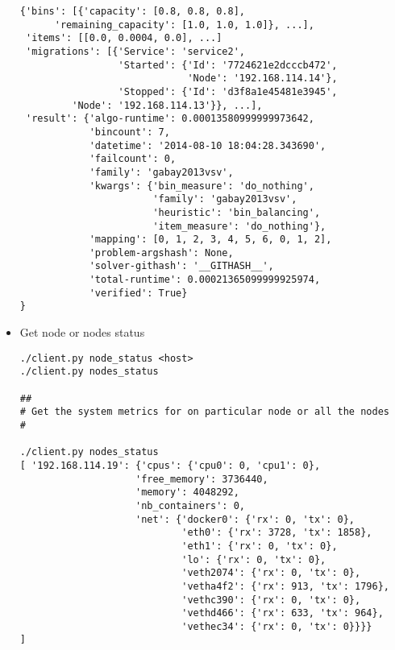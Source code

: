 \begin{itemize}
{\begin{lstlisting}
{'bins': [{'capacity': [0.8, 0.8, 0.8],
	  'remaining_capacity': [1.0, 1.0, 1.0]}, ...],
 'items': [[0.0, 0.0004, 0.0], ...]
 'migrations': [{'Service': 'service2',
                 'Started': {'Id': '7724621e2dcccb472',
                             'Node': '192.168.114.14'},
                 'Stopped': {'Id': 'd3f8a1e45481e3945',
		 'Node': '192.168.114.13'}}, ...],
 'result': {'algo-runtime': 0.00013580999999973642,
            'bincount': 7,
            'datetime': '2014-08-10 18:04:28.343690',
            'failcount': 0,
            'family': 'gabay2013vsv',
            'kwargs': {'bin_measure': 'do_nothing',
                       'family': 'gabay2013vsv',
                       'heuristic': 'bin_balancing',
                       'item_measure': 'do_nothing'},
            'mapping': [0, 1, 2, 3, 4, 5, 6, 0, 1, 2],
            'problem-argshash': None,
            'solver-githash': '__GITHASH__',
            'total-runtime': 0.00021365099999925974,
            'verified': True}
}

\end{lstlisting}
}
\item{Get node or nodes status
\begin{lstlisting}
./client.py node_status <host>
./client.py nodes_status

##
# Get the system metrics for on particular node or all the nodes
#

./client.py nodes_status
[ '192.168.114.19': {'cpus': {'cpu0': 0, 'cpu1': 0},
                    'free_memory': 3736440,
                    'memory': 4048292,
                    'nb_containers': 0,
                    'net': {'docker0': {'rx': 0, 'tx': 0},
                            'eth0': {'rx': 3728, 'tx': 1858},
                            'eth1': {'rx': 0, 'tx': 0},
                            'lo': {'rx': 0, 'tx': 0},
                            'veth2074': {'rx': 0, 'tx': 0},
                            'vetha4f2': {'rx': 913, 'tx': 1796},
                            'vethc390': {'rx': 0, 'tx': 0},
                            'vethd466': {'rx': 633, 'tx': 964},
                            'vethec34': {'rx': 0, 'tx': 0}}}}
]
\end{lstlisting}}
\end{itemize}
